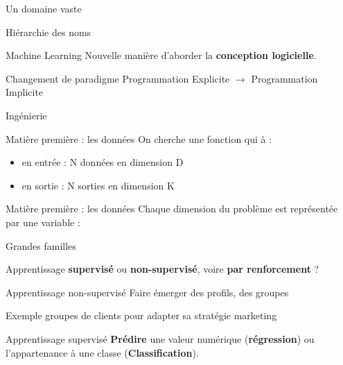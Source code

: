 \begin{frame}{Un domaine vaste}
\end{frame}

\begin{frame}{Hiérarchie des noms}
\end{frame}

\begin{frame}{Machine Learning}
  Nouvelle manière d'aborder la \textbf{conception logicielle}.
  \vfill
  \begin{block}{Changement de paradigme}
  Programmation Explicite $\rightarrow$ Programmation Implicite
  \end{block}
\end{frame}

\begin{frame}{Ingénierie}
\end{frame}

\begin{frame}{Matière première : les données}
  On cherche une fonction qui à :
  \begin{itemize}
    \item en entrée : N données en dimension D
    \item en sortie : N sorties en dimension K
  \end{itemize}
\end{frame}

\begin{frame}{Matière première : les données}
  Chaque dimension du problème est représentée par une variable : 
\end{frame}

\begin{frame}{Grandes familles}

  Apprentissage \textbf{supervisé} ou \textbf{non-supervisé}, voire \textbf{par renforcement} ?
\end{frame}

\begin{frame}{Apprentissage non-supervisé}
  Faire émerger des profils, des groupes
  \vfill
  \begin{exampleblock}{Exemple}
  groupes de clients pour adapter sa stratégie marketing
  \end{exampleblock}
\end{frame}

\begin{frame}{Apprentissage supervisé}
  \textbf{Prédire} une valeur numérique (\textbf{régression}) ou l'appartenance à une classe (\textbf{Classification}).
\end{frame}

